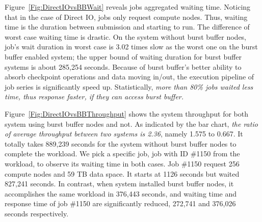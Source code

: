 Figure~\ref{Fig:DirectIOvsBBWait} reveals jobs aggregated waiting time.
Noticing that in the case of Direct IO, jobs only request compute nodes.
Thus, waiting time is the duration between submission
and starting to run.
The difference of worst case waiting time is drastic.
On the system without burst buffer nodes, job's wait duration in worst case is 3.02 times
slow as the worst one on the burst buffer enabled system;
the upper bound of waiting duration for burst buffer systems is about 285,254 seconds.
Because of burst buffer's better ability to
absorb checkpoint operations and data moving in/out,
the execution pipeline of job series is significantly speed up.
Statistically, \textit{more than 80\% jobs waited less time, thus response faster,
if they can access burst buffer.}


Figure~\ref{Fig:DirectIOvsBBThroughput} shows the system throughput for
both system using burst buffer nodes and not.
As indicated by the bar chart,
\textit{the ratio of average throughput between two systems is 2.36},
namely 1.575 to 0.667.
It totally takes 889,239 seconds for the system without burst buffer nodes to
complete the workload.
We pick a specific job, job with ID \#1150 from the workload, to observe its
waiting time in both cases.
Job \#1150 request 256 compute nodes and 59 TB data space.
It starts at 1126 seconds but waited 827,241 seconds.
In contrast, when system installed burst buffer nodes,
it accomplishes the same workload in 376,443 seconds, and waiting time and response time of job \#1150
are significantly reduced, 272,741 and 376,026 seconds respectively.


